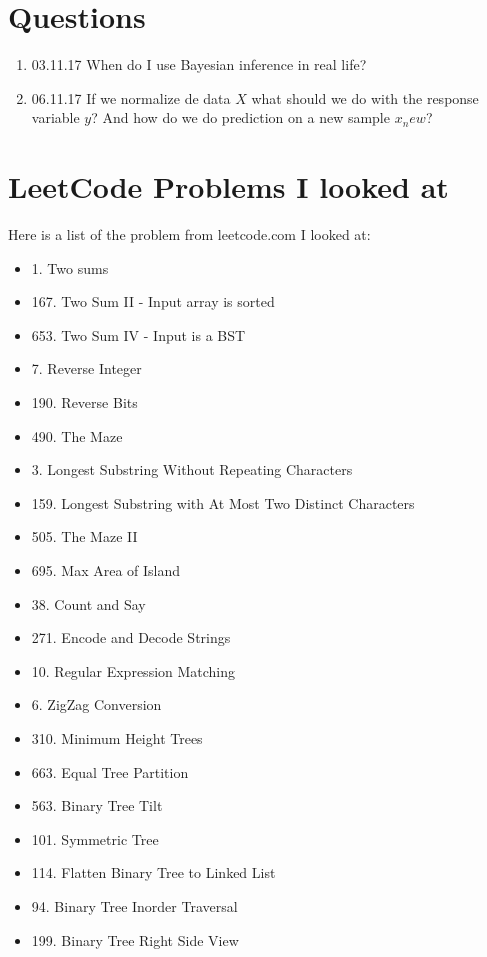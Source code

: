 \documentclass[11pt,a4paper]{article}
\begin{document}
\section{Questions}
\begin{enumerate}
\item 03.11.17 When do I use Bayesian inference in real life?
\item 06.11.17 If we normalize de data $X$ what should we do with the response variable $y$? And how do we do prediction on a new sample $x_new$? 
\end{enumerate}

\section{LeetCode Problems I looked at}

Here is a list of the problem from leetcode.com I looked at:
\begin{itemize}
\item 1. Two sums
\item 167. Two Sum II - Input array is sorted
\item 653. Two Sum IV - Input is a BST
\item 7. Reverse Integer
\item 190. Reverse Bits
\item 490. The Maze
\item 3. Longest Substring Without Repeating Characters
\item 159. Longest Substring with At Most Two Distinct Characters
\item 505. The Maze II
\item 695. Max Area of Island
\item 38. Count and Say
\item 271. Encode and Decode Strings
\item 10. Regular Expression Matching
\item 6. ZigZag Conversion
\item 310. Minimum Height Trees
\item 663. Equal Tree Partition
\item 563. Binary Tree Tilt
\item 101. Symmetric Tree
\item 114. Flatten Binary Tree to Linked List
\item 94. Binary Tree Inorder Traversal
\item 199. Binary Tree Right Side View
\end{itemize}
\end{document}
